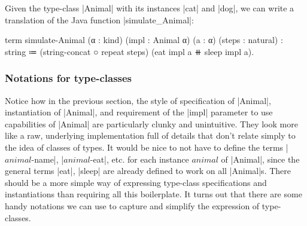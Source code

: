 Given the type-class \code|Animal| with its instances \code|cat| and \code|dog|, we can write a translation of the Java function \code|simulate_Animal|:
\begin{snippet}
term simulate-Animal (α : kind)
      (impl : Animal α) (a : α) (steps : natural)
  : string
  ≔ (string-concat ○ repeat steps)
      (eat impl a ⧺ sleep impl a).
\end{snippet}

\subsubsection{Notations for type-classes}

Notice how in the previous section, the style of specification of {\code|Animal|,} instantiation of {\code|Animal|,} and requirement of the \code|impl| parameter to use capabilities of \code|Animal| are particularly clunky and unintuitive.
They look more like a raw, underlying implementation full of details that don't relate simply to the idea of classes of types.
It would be nice to not have to define the terms \code|$animal$-name|, \code|$animal$-eat|, etc. for each instance $animal$ of {\code|Animal|,} since the general terms \code|eat|, \code|sleep| are already defined to work on all \code|Animal|s.
There should be a more simple way of expressing type-class specifications and instantiations than requiring all this boilerplate.
It turns out that there are some handy notations we can use to capture and simplify the expression of type-classes.

\newpage
